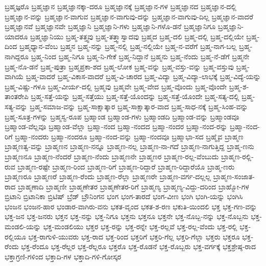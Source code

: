 {ಬ್ರಹ್ಮಜ್ಞರೊ
ಬ್ರಹ್ಮಜ್ಞಾನ
ಬ್ರಹ್ಮಜ್ಞಾನಕ್ಕಾ-ದರೂ
ಬ್ರಹ್ಮಜ್ಞಾನಕ್ಕೆ
ಬ್ರಹ್ಮಜ್ಞಾನ-ಗಳ
ಬ್ರಹ್ಮಜ್ಞಾನದ
ಬ್ರಹ್ಮಜ್ಞಾನ-ದಲ್ಲಿ
ಬ್ರಹ್ಮಜ್ಞಾನ-ವನ್ನು
ಬ್ರಹ್ಮಜ್ಞಾನ-ವಾಗುವ
ಬ್ರಹ್ಮಜ್ಞಾನ-ವಾಗುವು-ದನ್ನು
ಬ್ರಹ್ಮಜ್ಞಾನ-ವಾಗುವು-ದಿಲ್ಲ
ಬ್ರಹ್ಮಜ್ಞಾನ-ವಾದರೆ
ಬ್ರಹ್ಮಜ್ಞಾನವೆ
ಬ್ರಹ್ಮಜ್ಞಾನವೇ
ಬ್ರಹ್ಮಜ್ಞಾನಿ
ಬ್ರಹ್ಮಜ್ಞಾನಿ-ಗಳು
ಬ್ರಹ್ಮಜ್ಞಾನಿ-ಗಳೊ-ಡನೆ
ಬ್ರಹ್ಮಜ್ಞಾನಿಗೂ
ಬ್ರಹ್ಮಜ್ಞಾನಿ-ಯಾದರೂ
ಬ್ರಹ್ಮಜ್ಞಾನಿಯು
ಬ್ರಹ್ಮ-ತತ್ತ್ವವು
ಬ್ರಹ್ಮ-ತತ್ತ್ವಾಸ್ವಾದವು
ಬ್ರಹ್ಮದ
ಬ್ರಹ್ಮ-ದಲಿ
ಬ್ರಹ್ಮ-ದಲ್ಲಿ
ಬ್ರಹ್ಮ-ದಲ್ಲಿಯೇ
ಬ್ರಹ್ಮ-ದಿಂದ
ಬ್ರಹ್ಮಧ್ಯಾನ-ವೆಂಬ
ಬ್ರಹ್ಮನ
ಬ್ರಹ್ಮ-ನನ್ನು
ಬ್ರಹ್ಮ-ನಲ್ಲಿ
ಬ್ರಹ್ಮ-ನಲ್ಲಿಯೇ
ಬ್ರಹ್ಮ-ನ-ವರೆಗೆ
ಬ್ರಹ್ಮ-ನಾಗ-ಬಲ್ಲ
ಬ್ರಹ್ಮ-ನಾಗಿದ್ದರೂ
ಬ್ರಹ್ಮ-ನಿಂದ
ಬ್ರಹ್ಮ-ನಿಗೂ
ಬ್ರಹ್ಮ-ನಿ-ಗೇಕೆ
ಬ್ರಹ್ಮ-ನಿದ್ದಾನೆ
ಬ್ರಹ್ಮನು
ಬ್ರಹ್ಮ-ನೆಂದು
ಬ್ರಹ್ಮ-ನೆ-ಡೆಗೆ
ಬ್ರಹ್ಮನೇ
ಬ್ರಹ್ಮ-ನೊ-ಡನೆ
ಬ್ರಹ್ಮ-ಪುತ್ರಾ
ಬ್ರಹ್ಮಪ್ರಕಾ-ಶದ
ಬ್ರಹ್ಮ-ಲೋಕ
ಬ್ರಹ್ಮ-ವನ್ನು
ಬ್ರಹ್ಮ-ವಸ್ತು-ವನ್ನು
ಬ್ರಹ್ಮ-ವಸ್ತುವು
ಬ್ರಹ್ಮ-ವಾಗಿಯೆ
ಬ್ರಹ್ಮ-ವಾದರೆ
ಬ್ರಹ್ಮ-ವಿಕಾಸ-ವಾದರೆ
ಬ್ರಹ್ಮ-ವಿ-ಚಾರದ
ಬ್ರಹ್ಮ-ವಿದ್ಯಾ
ಬ್ರಹ್ಮ-ವಿದ್ಯಾ-ಲಾಭಕ್ಕೆ
ಬ್ರಹ್ಮ-ವಿದ್ಯೆ-ಯನ್ನು
ಬ್ರಹ್ಮ-ವಿಷ್ಣು-ಗಳೂ
ಬ್ರಹ್ಮ-ವೀರ್ಯ-ದಲ್ಲಿ
ಬ್ರಹ್ಮವು
ಬ್ರಹ್ಮವೇ
ಬ್ರಹ್ಮ-ವೇದ
ಬ್ರಹ್ಮ-ವೊಂದು
ಬ್ರಹ್ಮ-ವೊಂದೇ
ಬ್ರಹ್ಮ-ಶ-ತಾಂತರೇಪಿ
ಬ್ರಹ್ಮ-ಸತ್ತೆ-ಯನ್ನು
ಬ್ರಹ್ಮ-ಸತ್ತೆಯು
ಬ್ರಹ್ಮ-ಸತ್ತೆ-ಯೊಂದನ್ನು
ಬ್ರಹ್ಮ-ಸತ್ತೆ-ಯೊಂದೇ
ಬ್ರಹ್ಮ-ಸತ್ಯ-ದಲ್ಲಿ
ಬ್ರಹ್ಮ-ಸತ್ಯ-ವನ್ನು
ಬ್ರಹ್ಮ-ಸಮಾಜ-ವನ್ನು
ಬ್ರಹ್ಮ-ಸಾಕ್ಷಾತ್ಕಾರ
ಬ್ರಹ್ಮ-ಸಾಕ್ಷಾತ್ಕಾರ-ವಾದ
ಬ್ರಹ್ಮ-ಸಾಧ-ನಕ್ಕೆ
ಬ್ರಹ್ಮ-ಸಿಂಹ-ವನ್ನು
ಬ್ರಹ್ಮ-ಸೂತ್ರ-ಗಳನ್ನು
ಬ್ರಹ್ಮಸ್ವ-ರೂಪ
ಬ್ರಹ್ಮಾಂಡ
ಬ್ರಹ್ಮಾಂಡ-ಗಳು
ಬ್ರಹ್ಮಾಂಡದಿ
ಬ್ರಹ್ಮಾಂಡ-ವನ್ನು
ಬ್ರಹ್ಮಾಂಡವೂ
ಬ್ರಹ್ಮಾಂಡ-ವೆಲ್ಲವೂ
ಬ್ರಹ್ಮಾಂಡ-ವೆಲ್ಲಾ
ಬ್ರಹ್ಮಾ-ನಂದ
ಬ್ರಹ್ಮಾ-ನಂದದ
ಬ್ರಹ್ಮಾ-ನಂದರ
ಬ್ರಹ್ಮಾ-ನಂದ-ರನ್ನು
ಬ್ರಹ್ಮಾ-ನಂದ-ರಿಗೆ
ಬ್ರಹ್ಮಾ-ನಂದರು
ಬ್ರಹ್ಮಾ-ನಂದರೂ
ಬ್ರಹ್ಮಾ-ನಂದ-ವನ್ನು
ಬ್ರಹ್ಮಾ-ನಂದವೂ
ಬ್ರಹ್ಮಾಭಾ-ಸದ
ಬ್ರಹ್ಮೈವ
ಬ್ರಾಹ್ಮಣ
ಬ್ರಾಹ್ಮಣತ್ವ-ವನ್ನು
ಬ್ರಾಹ್ಮಣನ
ಬ್ರಾಹ್ಮಣ-ನನ್ನೂ
ಬ್ರಾಹ್ಮಣ-ನಲ್ಲ
ಬ್ರಾಹ್ಮಣ-ನಾ-ಗದೆ
ಬ್ರಾಹ್ಮಣ-ನಾಗುತ್ತಿದ್ದ
ಬ್ರಾಹ್ಮ-ಣನು
ಬ್ರಾಹ್ಮಣನೂ
ಬ್ರಾಹ್ಮಣ-ನೆಂದರೆ
ಬ್ರಾಹ್ಮಣ-ನೆಂದು
ಬ್ರಾಹ್ಮಣನೇ
ಬ್ರಾಹ್ಮಣರ
ಬ್ರಾಹ್ಮಣ-ರಲ್ಲ-ವೆಂಬುದು
ಬ್ರಾಹ್ಮಣ-ರಲ್ಲಿ-ರುವ
ಬ್ರಾಹ್ಮಣ-ರಷ್ಟೇ
ಬ್ರಾಹ್ಮಣ-ರಿಂದ
ಬ್ರಾಹ್ಮಣ-ರಿಗೆ
ಬ್ರಾಹ್ಮಣ-ರಿದ್ದಾರೆ
ಬ್ರಾಹ್ಮಣ-ರಿದ್ದಾರೆಯೊ
ಬ್ರಾಹ್ಮ-ಣರು
ಬ್ರಾಹ್ಮಣರೂ
ಬ್ರಾಹ್ಮಣರೆ
ಬ್ರಾಹ್ಮಣ-ರೆಂದು
ಬ್ರಾಹ್ಮಣ-ರೆಲ್ಲಾ
ಬ್ರಾಹ್ಮಣರೇ
ಬ್ರಾಹ್ಮಣ-ವರ್ಗ-ದಲ್ಲಲ್ಲ
ಬ್ರಾಹ್ಮಣ-ಸಂಜಾತ-ರಾದ
ಬ್ರಾಹ್ಮಣಾದಿ
ಬ್ರಾಹ್ಮಣೀ
ಬ್ರಾಹ್ಮಣೇತರ
ಬ್ರಾಹ್ಮಣೇತರ-ರಿಗೆ
ಬ್ರಾಹ್ಮಣ್ಯ
ಬ್ರಾಹ್ಮಣ್ಯ-ವಿದ್ದು-ದರಿಂದ
ಬ್ರಾಹ್ಮೋ-ಗಳ
ಬ್ರಿಟಾನಿ
ಬ್ರಿಟಾನಿಕಾ
ಬ್ರಿಟಿಷ್
ಬ್ರೆಡ್
ಬ್ರೌನಿಂಗನ
ಭಂಗ
ಭಂಗ-ತಾರದೆ
ಭಂಗ-ವೀಣ
ಭಂಗಿ
ಭಂಗಿ-ಯನ್ನು
ಭಂಗಿಸಿ
ಭಂಜನ
ಭಂಜನ-ಹಾರ
ಭಂಡಾರ-ವಾಗಿರು-ವನು
ಭಕತ-ವೃಂದ
ಭಕತ-ಶ-ರಣ
ಭಕುತಿ-ಯಿಂದಲಿ
ಭಕ್ತ
ಭಕ್ತ-ಗಣ-ವನ್ನು
ಭಕ್ತ-ಜನ
ಭಕ್ತ-ಜನರು
ಭಕ್ತನ
ಭಕ್ತ-ನನ್ನು
ಭಕ್ತ-ನಿಗೂ
ಭಕ್ತನು
ಭಕ್ತನೂ
ಭಕ್ತನೇ
ಭಕ್ತ-ನೊಬ್ಬ-ನನ್ನು
ಭಕ್ತ-ನೊಬ್ಬನು
ಭಕ್ತ-ಮಂಡಲಿ-ಯನ್ನು
ಭಕ್ತ-ಮಂಡಲಿಯು
ಭಕ್ತರ
ಭಕ್ತ-ರನ್ನು
ಭಕ್ತ-ರನ್ನೇ
ಭಕ್ತ-ರಲ್ಲವೆ
ಭಕ್ತ-ರಲ್ಲ-ವೆಂದು
ಭಕ್ತ-ರಲ್ಲಿ
ಭಕ್ತ-ರಲ್ಲಿಯೂ
ಭಕ್ತ-ರಾಗುಳಿ-ಯುವರು
ಭಕ್ತ-ರಾದ
ಭಕ್ತ-ರಿಂದ
ಭಕ್ತರಿಗೆ
ಭಕ್ತರಿ-ಗೆಲ್ಲ
ಭಕ್ತರಿ-ಗೆಲ್ಲಾ
ಭಕ್ತರು
ಭಕ್ತರೂ
ಭಕ್ತ-ರೆಂದು
ಭಕ್ತ-ರೆಂದೂ
ಭಕ್ತ-ರೆಲ್ಲರ
ಭಕ್ತ-ರೆಲ್ಲರೂ
ಭಕ್ತರೊ
ಭಕ್ತ-ರೊಡನೆ
ಭಕ್ತ-ರೊಬ್ಬರು
ಭಕ್ತ-ವರ್ಗಕ್ಕೆ
ಭಕ್ತಶ್ರೇಷ್ಠ-ರಾದ
ಭಕ್ತಾಗ್ರಣಿ-ಗಳಿಂದ
ಭಕ್ತಾದಿ-ಗಳ
ಭಕ್ತಾದಿ-ಗಳಿ-ಗೋಸ್ಕರ
}
